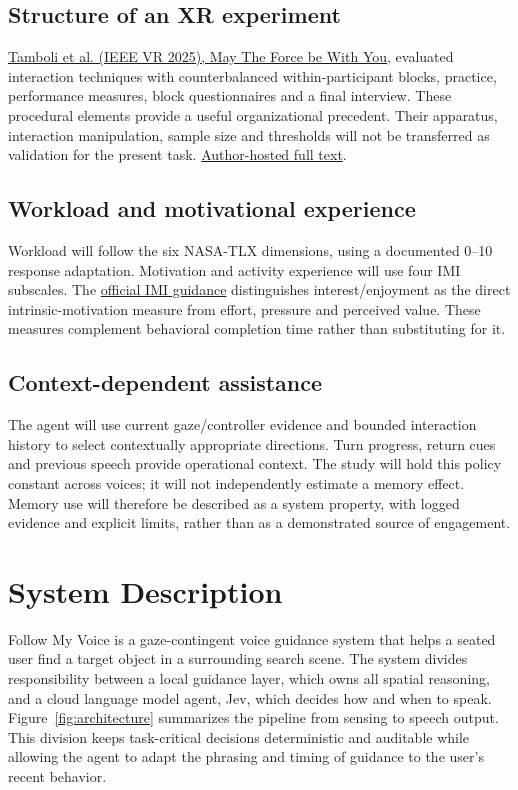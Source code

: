 \documentclass[11pt,letterpaper]{article}
\begin{document}
\subsection{Structure of an XR experiment}
\href{https://doi.org/10.1109/VR59515.2025.00071}{Tamboli et al. (IEEE VR 2025), May The Force be With You}, evaluated interaction techniques with counterbalanced within-participant blocks, practice, performance measures, block questionnaires and a final interview. These procedural elements provide a useful organizational precedent. Their apparatus, interaction manipulation, sample size and thresholds will not be transferred as validation for the present task. \href{https://encoderesearchlab.org/wp-content/uploads/2025/09/tamboli-ieeevr.pdf}{Author-hosted full text}.

\subsection{Workload and motivational experience}
Workload will follow the six NASA-TLX dimensions, using a documented 0--10 response adaptation. Motivation and activity experience will use four IMI subscales. The \href{https://selfdeterminationtheory.org/intrinsic-motivation-inventory/}{official IMI guidance} distinguishes interest/enjoyment as the direct intrinsic-motivation measure from effort, pressure and perceived value. These measures complement behavioral completion time rather than substituting for it.

\subsection{Context-dependent assistance}
The agent will use current gaze/controller evidence and bounded interaction history to select contextually appropriate directions. Turn progress, return cues and previous speech provide operational context. The study will hold this policy constant across voices; it will not independently estimate a memory effect. Memory use will therefore be described as a system property, with logged evidence and explicit limits, rather than as a demonstrated source of engagement.
\section{System Description}
Follow My Voice is a gaze-contingent voice guidance system that helps a seated user find a target object in a surrounding search scene. The system divides responsibility between a local guidance layer, which owns all spatial reasoning, and a cloud language model agent, Jev, which decides how and when to speak. Figure~\ref{fig:architecture} summarizes the pipeline from sensing to speech output. This division keeps task-critical decisions deterministic and auditable while allowing the agent to adapt the phrasing and timing of guidance to the user's recent behavior.
\end{document}
